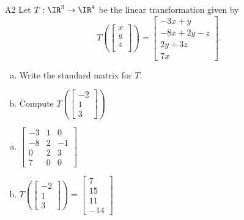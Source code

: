 \begin{problem}{A2}
Let $T: \IR^3\rightarrow \IR^4$ be the linear transformation given by $$T\left(\begin{bmatrix} x \\ y \\ z \\  \end{bmatrix} \right) = \begin{bmatrix} -3x+y \\ -8x+2y-z \\ 2y+3z \\ 7x \end{bmatrix}.$$
\begin{enumerate}[(a)]
\item Write the standard matrix for $T$.
\item Compute \( T\left( \begin{bmatrix}-2 \\ 1 \\ 3 \end{bmatrix} \right) \)
\end{enumerate}
\end{problem}
\begin{solution}
\begin{enumerate}[(a)]
\item \(\begin{bmatrix} -3 & 1 & 0 \\ -8 & 2 & -1 \\ 0 & 2 & 3 \\ 7 & 0 & 0 \end{bmatrix}\)
\item \( T\left( \begin{bmatrix}-2 \\ 1 \\ 3 \end{bmatrix}  \right) = \begin{bmatrix} 7 \\ 15 \\ 11 \\ -14 \end{bmatrix}  \)
\end{enumerate}
\end{solution}

